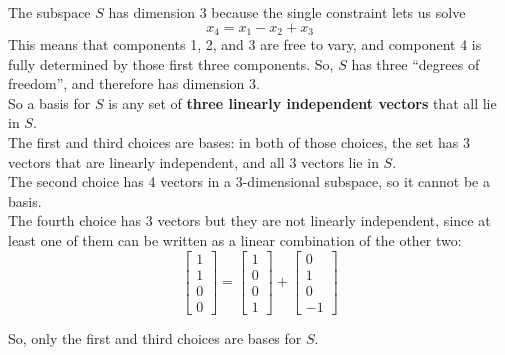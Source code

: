 \documentclass[11pt]{article}
\begin{document}
\begin{prob}[(8 pts)]

\begin{solution}
The subspace $S$ has dimension $3$ because the single constraint lets us solve
\[
x_4=x_1-x_2+x_3
\]
This means that components 1, 2, and 3 are free to vary, and component 4 is fully determined by those first three components. So, $S$ has three ``degrees of freedom'', and therefore has dimension $3$. \\

So a basis for $S$ is any set of \textbf{three linearly independent vectors} that all lie in $S$. \\

The first and third choices are bases: in both of those choices, the set has 3 vectors that are linearly independent, and all 3 vectors lie in $S$. \\

The second choice has 4 vectors in a 3-dimensional subspace, so it cannot be a basis. \\

The fourth choice has 3 vectors but they are not linearly independent, since at least one of them can be written as a linear combination of the other two:
\[
\begin{bmatrix}1\\1\\0\\0\end{bmatrix} = \begin{bmatrix}1\\0\\0\\1\end{bmatrix} + \begin{bmatrix}0\\1\\0\\-1\end{bmatrix}
\]

So, only the first and third choices are bases for $S$.

\end{solution}
\end{prob}

\newpage
\end{document}
